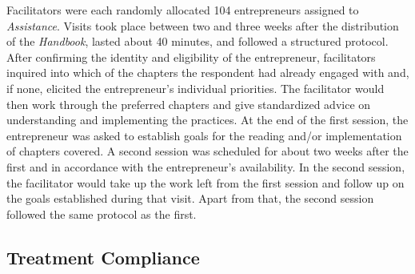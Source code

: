 \documentclass[11.5pt]{article}
\begin{document}
Facilitators were each randomly allocated 104 entrepreneurs assigned to \emph{Assistance}. Visits took place between two and three weeks after the distribution of the \emph{Handbook}, lasted about 40 minutes, and followed a structured protocol. After confirming the identity and eligibility of the entrepreneur, facilitators inquired into which of the chapters the respondent had already engaged with and, if none, elicited the entrepreneur's individual priorities. The facilitator would then work through the preferred chapters and give standardized advice on understanding and implementing the practices. %
At the end of the first session, the entrepreneur was asked to establish goals for the reading and/or implementation of chapters covered. A second session was scheduled for about two weeks after the first and in accordance with the entrepreneur's availability. In the second session, the facilitator would take up the work left from the first session and follow up on the goals established during that visit. Apart from that, the second session followed the same protocol as the first.

\subsection{Treatment Compliance}
\end{document}
